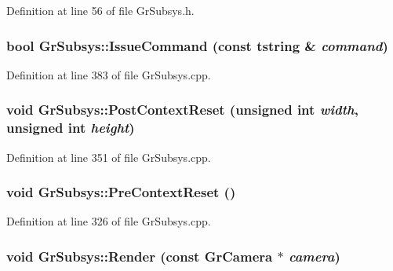 Definition at line 56 of file GrSubsys.h.\hypertarget{class_gr_subsys_2ae640ed8f7efaa789b10091e33ab5a3}{
\subsubsection[{IssueCommand}]{\setlength{\rightskip}{0pt plus 5cm}bool GrSubsys::IssueCommand (const {\bf tstring} \& {\em command})}}
\label{class_gr_subsys_2ae640ed8f7efaa789b10091e33ab5a3}




Definition at line 383 of file GrSubsys.cpp.\hypertarget{class_gr_subsys_dc45431cc61c9b21ff173c7f8bd1f578}{
\subsubsection[{PostContextReset}]{\setlength{\rightskip}{0pt plus 5cm}void GrSubsys::PostContextReset (unsigned int {\em width}, \/  unsigned int {\em height})}}
\label{class_gr_subsys_dc45431cc61c9b21ff173c7f8bd1f578}




Definition at line 351 of file GrSubsys.cpp.\hypertarget{class_gr_subsys_1e99ac2bc9378e2170b3592327a368b5}{
\subsubsection[{PreContextReset}]{\setlength{\rightskip}{0pt plus 5cm}void GrSubsys::PreContextReset ()}}
\label{class_gr_subsys_1e99ac2bc9378e2170b3592327a368b5}




Definition at line 326 of file GrSubsys.cpp.\hypertarget{class_gr_subsys_d20bc13ebade4221323d63b2925a9d00}{
\subsubsection[{Render}]{\setlength{\rightskip}{0pt plus 5cm}void GrSubsys::Render (const {\bf GrCamera} $\ast$ {\em camera})}}
\label{class_gr_subsys_d20bc13ebade4221323d63b2925a9d00}





